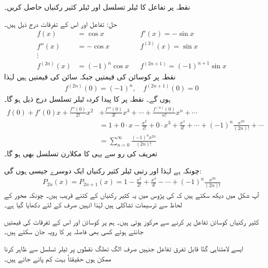 نقطہ  پر تفاعل  کا ٹیلر تسلسل اور ٹیلر کثیر رکنیاں حاصل کریں۔

حل:\quad
تفاعل اور اس کے تفرقات درج ذیل ہیں۔
\begin{align*}
f(x)&=\cos x&& f'(x)=-\sin x\\
f''(x)&=-\cos x&&f^{(3)}(x)=\sin x\\
\vdots&\\
f^{(2n)}(x)&=(-1)^n \cos x&&f^{(2n+1)}=(-1)^{n+1}\sin x
\end{align*}
نقطہ  پر کوسائن کی قیمتیں  جبکہ سائن کی قیمتیں  ہیں لہٰذا
\begin{align*}
f^{(2n)}(0)=(-1)^n,\quad f^{(2n+1)}(0)=0
\end{align*}
ہوں گے۔ نقطہ  پر  کا پیدا کردہ ٹیلر تسلسل درج ذیل ہو گا۔
\begin{align*}
f(0)+f'(0)x+\frac{f''(0)}{2!}x^2&+\frac{f'''(0)}{3!}x^3+\cdots+\frac{f^{(n)}(0)}{n!}x^n+\cdots\\
&=1+0\cdot x-\frac{x^2}{2!}+0\cdot x^3+\frac{x^4}{4!}+\cdots+(-1)^n\frac{x^{2n}}{(2n)!}+\cdots\\
&=\sum_{n=0}^{\infty}\frac{(-1)^n x^{2n}}{(2n)!}
\end{align*}
تعریف کی رو سے یہی  کا مکلارن تسلسل بھی ہو گا۔ 

چونکہ  ہے لہٰذا  اور  رتبی ٹیلر کثیر رکنیاں ایک دوسرے جیسی ہوں گی:
\begin{align*}
P_{2n}(x)=P_{2n+1}(x)=1-\frac{x^2}{2!}+\frac{x^4}{4!}-\cdots+(-1)^n\frac{x^{2n}}{(2n)!}
\end{align*}
آپ شکل  میں دیکھ سکتے ہیں کہ  کی پڑوس میں یہ کثیر رکنیاں  کے کتنے قریب ہیں۔ چونکہ  محور کے لحاظ سے ترسیمات تشاکلی ہیں لہٰذا انہیں صرف  کے لئے دکھایا گیا ہے۔ 

کثیر رکنیاں  کوسائن تفاعل پر  کرنے سے مرکوز ہوتی ہیں۔ ہم  پر کوسائن اور اس کے تفرقات کی قیمتیں جانتے ہوئے کسی بھی فاصلہ پر  کا رویہ جان سکتے ہیں۔

ایسے لامتناہی گنّا قابل تفرق تفاعل جنہیں صرف الگ تھلگ نقطوں پر ٹیلر تسلسل سے ظاہر کرنا ممکن ہوں حقیقتاً بہت کم پائے جاتے ہیں۔

\quad {}

